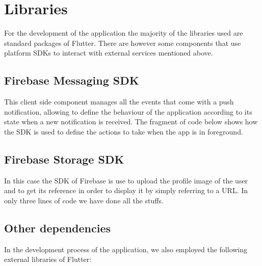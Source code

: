 \documentclass[../../dd.tex]{subfiles}
\begin{document}
    \section{Libraries}
    For the development of the application the majority of the libraries used are standard packages of Flutter. There are however some components that use platform SDKs to interact with external services mentioned above.

    \subsection{Firebase Messaging SDK}
    This client side component manages all the events that come with a push notification, allowing to define the behaviour of the application according to its state when a new notification is received. The fragment of code below shows how the SDK is used to define the actions to take when the app is in foreground.
    \vspace{2 mm}
    
    \vspace{8 mm}

    \subsection{Firebase Storage SDK}
    In this case the SDK of Firebase is use to upload the profile image of the user and to get its reference in order to display it by simply referring to a URL. In only three lines of code we have done all the stuffs.
    \vspace{2 mm}
    
    \vspace{8 mm}

    \subsection{Other dependencies}
    In the development process of the application, we also employed the following external libraries of Flutter:
\end{document}

